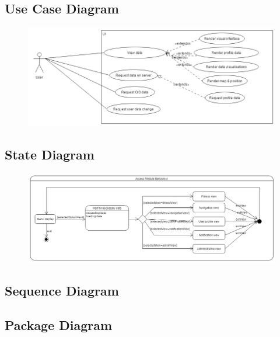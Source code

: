 \subsection{Use Case Diagram}
\begin{figure}[!htbp]
	\includegraphics[width=\textwidth]{Access_Modules/AUCD_v2.png}
\end{figure}

\subsection{State Diagram}
\begin{figure}[!htbp]
	\includegraphics[width=\textwidth]{Access_Modules/AccessStateDiagram.png}
\end{figure}

\subsection{Sequence Diagram}

\subsection{Package Diagram}

